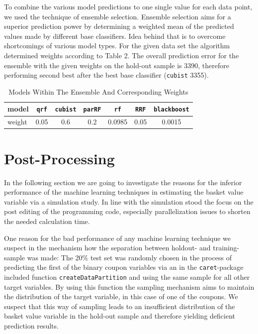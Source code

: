 \documentclass[12pt]{article}
\begin{document}
To combine the various model predictions to one single value for each data point, we used the technique of ensemble selection.\cite{Caruana04} Ensemble selection aims for a superior prediction power by determining a weighted mean of the predicted values made by different base classifiers. Idea behind that is to overcome shortcomings of various model types. For the given data set the algorithm determined weights according to Table 2. The overall prediction error for the ensemble with the given weights on the hold-out sample is 3390, therefore performing second best after the best base classifier (\texttt{cubist} 3355).

\begin{table}
\centering
\begin{tabular}{l|cccccc}
\hline
\hline
model &\texttt{qrf} & \texttt{cubist} & \texttt{parRF} & \texttt{rf} & \texttt{RRF} & \texttt{blackboost} \\ \hline
weight &0.05 & 0.6 & 0.2 & 0.0985 & 0.05 & 0.0015\\
\hline
\hline
\end{tabular}
\caption{Models Within The Ensemble And Corresponding Weights}
\end{table}


\section{Post-Processing}

In the following section we are going to investigate the reasons for the inferior performance of the machine learning techniques in estimating the basket value variable via a simulation study. In line with the simulation stood the focus on the post editing of the programming code, especially parallelization issues to shorten the needed calculation time.

One reason for the bad performance of any machine learning technique we suspect in the mechanism how the separation between holdout- and training-sample was made: The 20\% test set was randomly chosen in the process of predicting the first of the binary coupon variables via an in the \texttt{caret}-package included function \texttt{createDataPartition} and using the same sample for all other target variables. By using this function the sampling mechanism aims to maintain the distribution of the target variable, in this case of one of the coupons. We suspect that this way of sampling leads to an insufficient distribution of the basket value variable in the hold-out sample and therefore yielding deficient prediction results.
\end{document}
